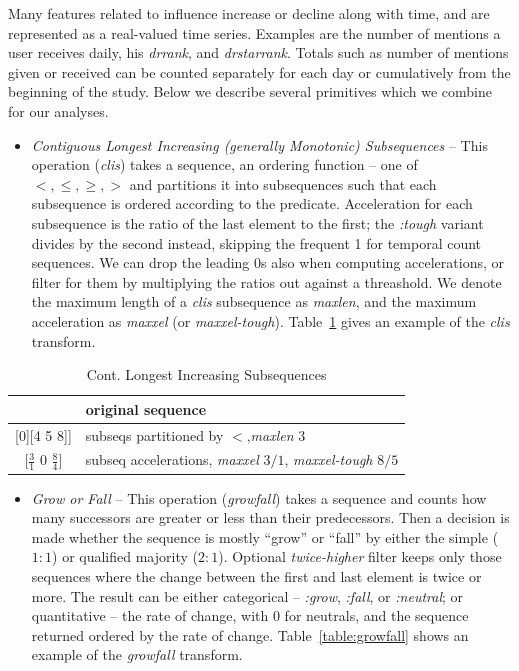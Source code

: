 \documentclass[10pt,oneside]{memoir}
\begin{document}
\begin{Spacing}{2}
Many features related to influence increase or decline along with time, and are represented as a real-valued time series.  Examples are the number of mentions a user receives daily, his {\itshape drrank}, and {\itshape drstarrank}.  Totals such as number of mentions given or received can be counted separately for each day or cumulatively from the beginning of the study.  Below we describe several primitives which we combine for our analyses.


\begin{itemize}


\item {\itshape Contiguous Longest Increasing (generally Monotonic) Subsequences} -- This operation ({\itshape clis}) takes a sequence, an ordering function -- one of $<,\leq,\geq,>$ and partitions it into subsequences such that each subsequence is ordered according to the predicate.  Acceleration for each subsequence is the ratio of the last element to the first; the {\itshape :tough} variant divides by the second instead, skipping the frequent 1 for temporal count sequences.  We can drop the leading 0s also when computing accelerations, or filter for them by multiplying the ratios out against a threashold.  We denote the maximum length of a {\itshape clis} subsequence as {\itshape maxlen}, and the maximum acceleration as {\itshape maxxel} (or {\itshape maxxel-tough}).  Table~\ref{table:clis} gives an example of the {\itshape clis} transform.
\end{itemize}


\begin{table}
    \caption{Cont. Longest Increasing Subsequences}
    \label{table:clis}

    \centering

    \begin{tabular}{|c|p{2in}|}
    \hline
        [1 2 3 0 4 5 8] & original sequence\\
    \hline
        [[1 2 3][0][4 5 8]] & subseqs partitioned by $<$,\emph{maxlen} $3$  \\
    \hline
        $[\frac{3}{1}$ 0 $\frac{8}{4}]$ & subseq accelerations, \emph{maxxel} $3/1$, \emph{maxxel-tough} $8/5$ \\
    \hline
    \end{tabular}
\end{table}
\begin{itemize}


\item {\itshape Grow or Fall} -- This operation ({\itshape growfall}) takes a sequence and counts how many successors are greater or less than their predecessors.  Then a decision is made whether the sequence is mostly ``grow'' or ``fall'' by either the simple ($1:1$) or qualified majority ($2:1$).  Optional {\itshape twice-higher} filter keeps only those sequences where the change between the first and last element is twice or more.  The result can be either categorical -- {\itshape :grow}, {\itshape :fall}, or {\itshape :neutral}; or quantitative -- the rate of change, with 0 for neutrals, and the sequence returned ordered by the rate of change.  Table~\ref{table:growfall} shows an example of the {\itshape growfall} transform.
\end{itemize}



\end{Spacing}
\end{document}
